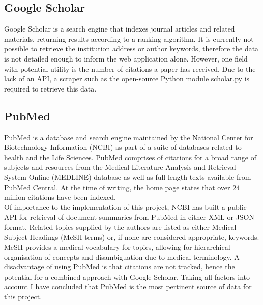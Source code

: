 \documentclass[PROP_AGutteridge_CS.tex]{subfiles}
\begin{document}
\noindent \subsection{Google Scholar}
Google Scholar is a search engine that indexes journal articles and related materials, returning results according to a ranking algorithm. It is currently not possible to retrieve the institution address or author keywords, therefore the data is not detailed enough to inform the web application alone. However, one field with potential utility is the number of citations a paper has received. Due to the lack of an API, a scraper such as the open-source Python module scholar.py\cite{scholar} is required to retrieve this data.

\noindent \subsection{PubMed}
PubMed is a database and search engine maintained by the National Center for Biotechnology Information (NCBI) as part of a suite of databases related to health and the Life Sciences. PubMed comprises of citations for a broad range of subjects and resources from the Medical Literature Analysis and Retrieval System Online (MEDLINE) database as well as full-length texts available from PubMed Central. At the time of writing, the home page\cite{pubmed} states that over 24 million citations have been indexed. \\
\newline \noindent Of importance to the implementation of this project, NCBI has built a public API for retrieval of document summaries from PubMed in either XML or JSON format. Related topics supplied by the authors are listed as either Medical Subject Headings (MeSH terms) or, if none are considered appropriate, keywords. MeSH provides a medical vocabulary for topics, allowing for hierarchical organisation of concepts and disambiguation due to medical terminology\cite{mesh}. A disadvantage of using PubMed is that citations are not tracked, hence the potential for a combined approach with Google Scholar. Taking all factors into account I have concluded that PubMed is the most pertinent source of data for this project.
\end{document}
